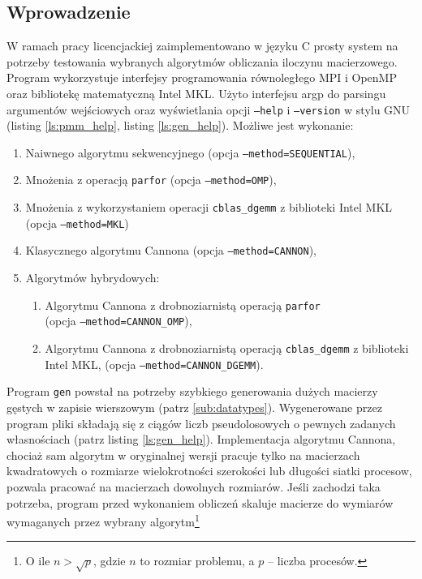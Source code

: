 \subsection{Wprowadzenie}
W ramach pracy licencjackiej zaimplementowano w języku C prosty system na potrzeby testowania wybranych algorytmów obliczania iloczynu macierzowego. Program wykorzystuje interfejsy programowania równoległego MPI i OpenMP oraz bibliotekę matematyczną Intel MKL. Użyto interfejsu argp do parsingu argumentów wejściowych oraz wyświetlania opcji \texttt{--help} i \texttt{--version} w stylu GNU (listing \ref{ls:pmm_help}, listing \ref{ls:gen_help}). Możliwe jest wykonanie:
\begin{enumerate}
\item Naiwnego algorytmu sekwencyjnego (opcja \texttt{--method=SEQUENTIAL}),
\item Mnożenia z operacją \texttt{parfor} (opcja \texttt{--method=OMP}),
\item Mnożenia z wykorzystaniem operacji \texttt{cblas\_dgemm} z biblioteki Intel MKL (opcja \texttt{--method=MKL})
\item Klasycznego algorytmu Cannona (opcja \texttt{--method=CANNON}),
\item Algorytmów hybrydowych:
\begin{enumerate}
\item Algorytmu Cannona z drobnoziarnistą operacją \texttt{parfor} \\ (opcja \texttt{--method=CANNON\_OMP}), 
\item Algorytmu Cannona z drobnoziarnistą operacją \texttt{cblas\_dgemm} z biblioteki Intel MKL, (opcja \texttt{--method=CANNON\_DGEMM}).
\end{enumerate}
\end{enumerate}

Program \texttt{gen} powstał na potrzeby szybkiego generowania dużych macierzy gęstych w zapisie wierszowym (patrz \ref{sub:datatypes}). Wygenerowane przez program pliki składają się z ciągów liczb pseudolosowych o pewnych zadanych własnościach (patrz listing \ref{ls:gen_help}). 
Implementacja algorytmu Cannona, chociaż sam algorytm w oryginalnej wersji pracuje tylko na macierzach kwadratowych o rozmiarze wielokrotności szerokości lub długości siatki procesow, pozwala pracować na macierzach dowolnych rozmiarów. Jeśli zachodzi taka potrzeba, program przed wykonaniem obliczeń skaluje macierze do wymiarów wymaganych przez wybrany algorytm\footnote{O ile \(n>\sqrt{p}\), gdzie \(n\) to rozmiar problemu, a \(p\) -- liczba procesów.}


